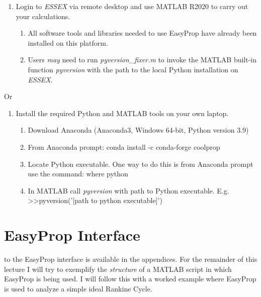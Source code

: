 \begin{enumerate}
\item Login to \emph{ESSEX} via remote desktop and use MATLAB R2020 to carry out your calculations. 
\begin{enumerate}
\item All software tools and libraries needed to use EasyProp have already been installed on this platform.
\item Users \emph{may} need to run \emph{pyversion\_fixer.m} to invoke the MATLAB built-in function \emph{pyversion} with the path to the local Python installation on \emph{ESSEX}.
\end{enumerate}
\end{enumerate}
Or
\begin{enumerate}[resume]
\item Install the required Python and MATLAB tools on your own laptop.
\begin{enumerate}
\item Download Anaconda (Anaconda3, Windows 64-bit, Python version 3.9) 
\item From Anaconda prompt: conda install -c conda-forge coolprop
\item Locate Python executable.  One way to do this is from Anaconda prompt use the command: where python
\item In MATLAB call \emph{pyversion} with path to Python executable. E.g. >>pyversion('[path to python executable]')
\end{enumerate}
\end{enumerate}

\section{EasyProp Interface}
 to the EasyProp interface is available in the appendices.  For the remainder of this lecture I will try to exemplify the \emph{structure} of a MATLAB script in which EasyProp is being used.  I will follow this with a worked example where EasyProp is used to analyze a simple ideal Rankine Cycle.

